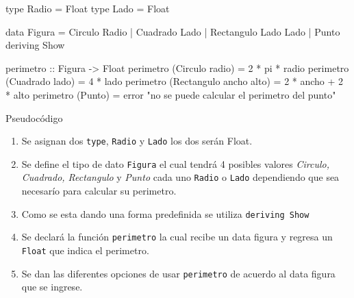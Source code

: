 \documentclass[
]{article}
\newenvironment{Shaded}{\begin{snugshade}}{\end{snugshade}}
\newcommand{\DecValTok}[1]{\textcolor[rgb]{0.00,0.00,0.81}{#1}}
\newcommand{\NormalTok}[1]{#1}
\newcommand{\StringTok}[1]{\textcolor[rgb]{0.31,0.60,0.02}{#1}}
\begin{document}
\begin{Shaded}
\begin{Highlighting}[]
\NormalTok{type Radio = Float}
\NormalTok{type Lado = Float}

\NormalTok{data Figura = Circulo Radio}
\NormalTok{            | Cuadrado Lado}
\NormalTok{            | Rectangulo Lado Lado}
\NormalTok{            | Punto}
\NormalTok{              deriving Show}
            
\NormalTok{perimetro :: Figura -> Float}
\NormalTok{perimetro (Circulo radio) = }\DecValTok{2}\NormalTok{ * pi * radio}
\NormalTok{perimetro (Cuadrado lado) = }\DecValTok{4}\NormalTok{ * lado}
\NormalTok{perimetro (Rectangulo ancho alto) = }\DecValTok{2}\NormalTok{ * ancho + }\DecValTok{2}\NormalTok{ * alto}
\NormalTok{perimetro (Punto) = error }\StringTok{"no se puede calcular el perimetro del punto"}
\end{Highlighting}
\end{Shaded}

Pseudocódigo

\begin{enumerate}
\def\labelenumi{(\arabic{enumi})}
\item
  Se asignan dos \texttt{type}, \texttt{Radio} y \texttt{Lado} los dos
  serán Float.
\item
  Se define el tipo de dato \texttt{Figura} el cual tendrá 4 posibles
  valores \emph{Circulo, Cuadrado, Rectangulo} y \emph{Punto} cada uno
  \texttt{Radio} o \texttt{Lado} dependiendo que sea necesarío para
  calcular su perimetro.
\item
  Como se esta dando una forma predefinida se utiliza
  \texttt{deriving\ Show}
\item
  Se declará la función \texttt{perimetro} la cual recibe un data figura
  y regresa un \texttt{Float} que indica el perimetro.
\item
  Se dan las diferentes opciones de usar \texttt{perimetro} de acuerdo
  al data figura que se ingrese.
\end{enumerate}
\end{document}
